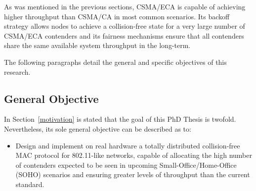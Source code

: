 As was mentioned in the previous sections, CSMA/ECA is capable of achieving higher throughput than CSMA/CA in most common scenarios. Its backoff strategy allows nodes to achieve a collision-free state for a very large number of CSMA/ECA contenders and its fairness mechanisms ensure that all contenders share the same available system throughput in the long-term.

The following paragraphs detail the general and specific objectives of this research. 

\subsection{General Objective}
In Section~\ref{motivation} is stated that the goal of this PhD Thesis is twofold. Nevertheless, its sole general objective can be described as to:
\begin{itemize}
	\item Design and implement on real hardware a totally distributed collision-free MAC protocol for 802.11-like networks, capable of allocating the high number of contenders expected to be seen in upcoming Small-Office/Home-Office (SOHO) scenarios and ensuring greater levels of throughput than the current standard.
\end{itemize}

